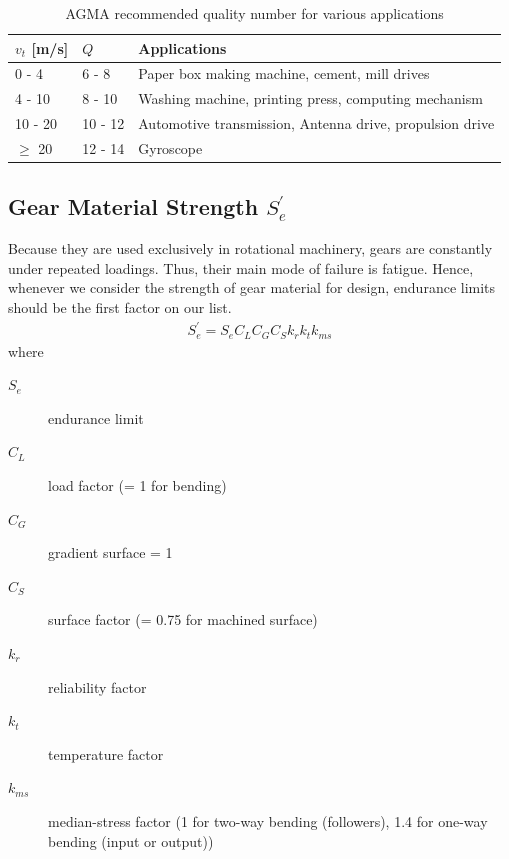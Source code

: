 \documentclass[a4paper,openany]{tufte-book}
\begin{document}
\begin{table}[htbp]
\caption{\label{tab: AGMA recommended quality}AGMA recommended quality number for various applications}
\centering
\begin{tabular}{llp{5cm}}
\toprule
\(v_{t}\) [m/s] & \(Q\) & Applications\\
\midrule
0 - 4 & 6 - 8 & Paper box making machine, cement, mill drives\\
4 - 10 & 8 - 10 & Washing machine, printing press, computing mechanism\\
10 - 20 & 10 - 12 & Automotive transmission, Antenna drive, propulsion drive\\
\(\geqslant\) 20 & 12 - 14 & Gyroscope\\
\bottomrule
\end{tabular}
\end{table}

\subsection{Gear Material Strength \(S_e^{\prime}\)}
\label{sec:orgc83803e}

Because they are used exclusively in rotational machinery, gears are constantly under repeated loadings. Thus, their main mode of failure is fatigue. Hence, whenever we consider the strength of gear material for design, endurance limits should be the first factor on our list.
\begin{align}
  S_{e}^{\prime} = S_{e}C_{L}C_{G}C_{S}k_{r}k_{t}k_{ms}
\end{align}
where

\begin{description}
\item[{\(S_{e}\)}] endurance limit

\item[{\(C_{L}\)}] load factor (= 1 for bending)

\item[{\(C_{G}\)}] gradient surface = 1

\item[{\(C_{S}\)}] surface factor (= 0.75 for machined surface)

\item[{\(k_{r}\)}] reliability factor

\item[{\(k_{t}\)}] temperature factor

\item[{\(k_{ms}\)}] median-stress factor (1 for two-way bending (followers), 1.4 for one-way bending (input or output))
\end{description}
\end{document}
